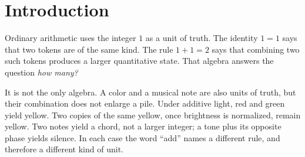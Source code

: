 \documentclass[12pt, a4paper]{article}
\begin{document}
%

\section{Introduction}

Ordinary arithmetic uses the integer $1$ as a unit of truth.
The identity $1=1$ says that two tokens are of the same kind.
The rule $1+1=2$ says that combining two such tokens produces a
larger quantitative state. That algebra answers the question
\emph{how many?}

It is not the only algebra. A color and a musical note are also
units of truth, but their combination does not enlarge a pile.
Under additive light, red and green yield yellow. Two copies of
the same yellow, once brightness is normalized, remain yellow.
Two notes yield a chord, not a larger integer; a tone plus its
opposite phase yields silence. In each case the word ``add''
names a different rule, and therefore a different kind of unit.
\end{document}
